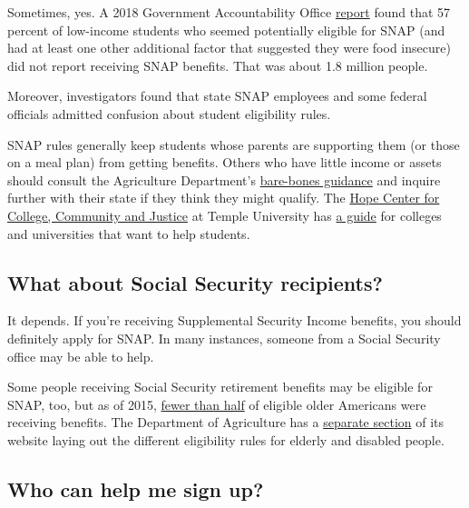 Sometimes, yes. A 2018 Government Accountability Office
\href{https://www.gao.gov/assets/700/696254.pdf}{report} found that 57
percent of low-income students who seemed potentially eligible for SNAP
(and had at least one other additional factor that suggested they were
food insecure) did not report receiving SNAP benefits. That was about
1.8 million people.

Moreover, investigators found that state SNAP employees and some federal
officials admitted confusion about student eligibility rules.

SNAP rules generally keep students whose parents are supporting them (or
those on a meal plan) from getting benefits. Others who have little
income or assets should consult the Agriculture Department's
\href{https://www.fns.usda.gov/snap/students}{bare-bones guidance} and
inquire further with their state if they think they might qualify. The
\href{https://hope4college.com/about-the-hope-center/}{Hope Center for
College, Community and Justice} at Temple University has
\href{https://hope4college.com/wp-content/uploads/2019/04/Beyond-the-Food-Pantry-Student-Access-to-SNAP.pdf}{a
guide} for colleges and universities that want to help students.

\hypertarget{what-about-social-security-recipients}{%
\subsection{What about Social Security
recipients?}\label{what-about-social-security-recipients}}

It depends. If you're receiving Supplemental Security Income benefits,
you should definitely apply for SNAP. In many instances, someone from a
Social Security office may be able to help.

Some people receiving Social Security retirement benefits may be
eligible for SNAP, too, but as of 2015,
\href{https://www.fns.usda.gov/pressrelease/2015/020215}{fewer than
half} of eligible older Americans were receiving benefits. The
Department of Agriculture has a
\href{https://www.fns.usda.gov/snap/eligibility/elderly-disabled-special-rules}{separate
section} of its website laying out the different eligibility rules for
elderly and disabled people.

\hypertarget{who-can-help-me-sign-up}{%
\subsection{Who can help me sign up?}\label{who-can-help-me-sign-up}}


